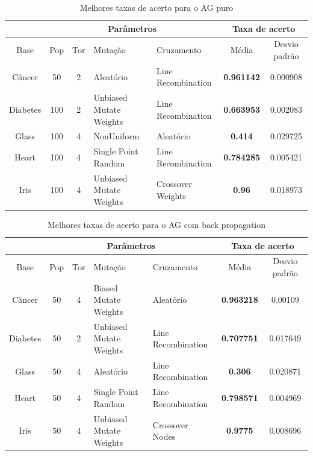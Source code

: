 \documentclass[12pt]{article}
\begin{document}
\begin{table}[h]
\center
\begin{tabular}{c|c|c|p{3cm}|p{3cm}|c|c|}
\cline{2-7}
&  \multicolumn{4}{|c|}{Parâmetros} & \multicolumn{2}{|c|}{Taxa de acerto} \\ \hline
\multicolumn{1}{|c|}{Base} & Pop & Tor & Mutação & Cruzamento & Média & Desvio padrão  \\ \hline
\multicolumn{1}{|c|}{Câncer} & 50 & 2 & Aleatório & Line Recombination & \textbf{0.961142} & 0.000908 \\ \hline
\multicolumn{1}{|c|}{Diabetes} & 100 & 2 & Unbiased Mutate Weights & Line Recombination & \textbf{0.663953} & 0.002083 \\ \hline
\multicolumn{1}{|c|}{Glass} & 100 & 4 & NonUniform & Aleatório & \textbf{0.414} & 0.029725 \\ \hline 
\multicolumn{1}{|c|}{Heart} & 100 & 4 & Single Point Random & Line Recombination & \textbf{0.784285} & 0.005421 \\ \hline
\multicolumn{1}{|c|}{Iris} & 100 & 4 & Unbiased Mutate Weights & Crossover Weights & \textbf{0.96} & 0.018973 \\ \hline
\end{tabular}
\caption{Melhores taxas de acerto para o AG puro}
\label{tab:hitbest}
\end{table}

\begin{table}[h]
\center
\begin{tabular}{c|c|c|p{3cm}|p{3cm}|c|c|}
\cline{2-7}
&  \multicolumn{4}{|c|}{Parâmetros} & \multicolumn{2}{|c|}{Taxa de acerto} \\ \hline
\multicolumn{1}{|c|}{Base} & Pop & Tor & Mutação & Cruzamento & Média & Desvio padrão  \\ \hline
\multicolumn{1}{|c|}{Câncer} & 50 & 4 & Biased Mutate Weights & Aleatório & \textbf{0.963218} & 0.00109 \\ \hline
\multicolumn{1}{|c|}{Diabetes} & 50 & 2 & Unbiased Mutate Weights & Line Recombination & \textbf{0.707751} & 0.017649 \\ \hline
\multicolumn{1}{|c|}{Glass} & 50 & 4 & Aleatório & Line Recombination & \textbf{0.306} & 0.020871 \\ \hline 
\multicolumn{1}{|c|}{Heart} & 50 & 4 & Single Point Random & Line Recombination & \textbf{0.798571} & 0.004969 \\ \hline
\multicolumn{1}{|c|}{Iris} & 50 & 4 & Unbiased Mutate Weights & Crossover Nodes & \textbf{0.9775} & 0.008696 \\ \hline
\end{tabular}
\caption{Melhores taxas de acerto para o AG com back propagation}
\label{tab:hitbest2}
\end{table}
\end{document}
